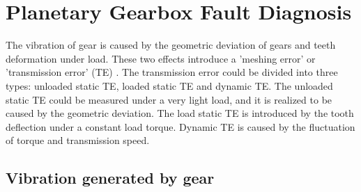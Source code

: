 \section{Planetary Gearbox Fault Diagnosis}

The vibration of gear is caused by the geometric deviation of gears and teeth deformation under load. These two effects introduce a 'meshing error' or 'transmission error' (TE) \cite{vbcm}. The transmission error could be divided into three types: unloaded static TE, loaded static TE and dynamic TE. The unloaded static TE could be measured under a very light load, and it is realized to be caused by the geometric deviation. The load static TE is introduced by the tooth deflection under a constant load torque. Dynamic TE is caused by the fluctuation of torque and transmission speed.


\subsection{Vibration generated by gear}

